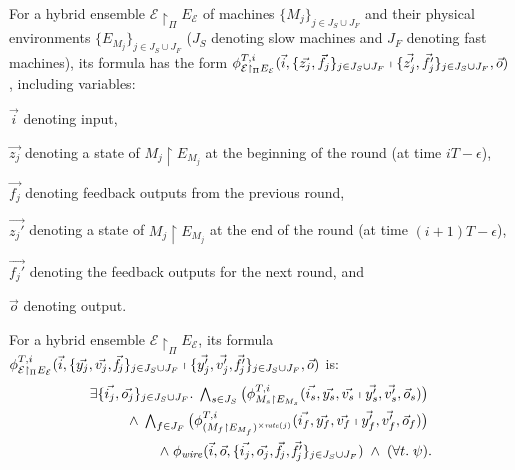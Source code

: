 For a hybrid ensemble $\mathcal{E} \restriction_{\Pi} E_\mathcal{E}$ 
of machines  $\{M_j\}_{j\in J_S\cup J_F}$ and their physical environments $\{E_{M_j}\}_{j\in J_S\cup J_F}$
($J_S$ denoting slow machines and $J_F$ denoting fast machines),
its formula has the form
$\phi_{\mathcal{E} \restriction_{\Pi} E_\mathcal{E}}^{T,i}(
	\vec{i}, \{\vec{z_j},\vec{f_j}\}_{j\in J_S\cup J_F}
	\shortmid 
	\{\vec{z'_j}, \vec{f_j'}\}_{j\in J_S\cup J_F}, \vec{o})$,
%
including variables:
\begin{inparaenum}[(i)]
	\item $\vec{i}$ denoting input, 
	\item $\vec{z_j}$ denoting a state of $M_j \restriction E_{M_j}$ at the beginning of the round 
		(at time $iT - \epsilon$),
	\item $\vec{f_j}$ denoting feedback outputs from the previous round,
	\item $\vec{z_j'}$ denoting a state of $M_j \restriction E_{M_j}$ at the end of the round 
		(at time $(i+1)T - \epsilon$), 
	\item $\vec{f_j'}$ denoting the feedback outputs for the next round,	and 
	\item $\vec{o}$ denoting output.
\end{inparaenum}


\begin{definition}
For a hybrid ensemble $\mathcal{E} \restriction_{\Pi} E_\mathcal{E}$, %
its formula
$\phi_{\mathcal{E} \restriction_{\Pi} E_\mathcal{E}}^{T,i}(
	\vec{i}, \{\vec{y_j}, \vec{v_j},\vec{\mathit{f}_j}\}_{j\in J_S\cup J_F}
	\shortmid 
	\{\vec{y'_j}, \vec{v'_j}, \vec{\mathit{f}_j'}\}_{j\in J_S\cup J_F}, \vec{o})$ is:
\begin{align*}
\exists \{\vec{i_j},\vec{o_j}\}_{j\in J_S\cup J_F}.\;
\textstyle\bigwedge_{s \in J_S}
\big(\phi_{M_s \restriction E_{M_s}}^{T,i}(\vec{i_s}, \vec{y_s}, \vec{v_s} \shortmid \vec{y'_s}, \vec{v'_s}, \vec{o}_s)\big)
\phantom{.}
\\
\wedge\;
\textstyle\bigwedge_{f \in J_F}
\big(\phi_{(M_f \restriction E_{M_f})^{\times\mathit{rate}(j)}}^{T,i}(\vec{i_f}, \vec{y_f}, \vec{v_f} \shortmid \vec{y'_f}, \vec{v'_f}, \vec{o}_f)\big)
\phantom{.}
\\
\wedge\;
\phi_\mathit{wire}(\vec{i},\vec{o},\{\vec{i_j},\vec{o_j},\vec{\mathit{f}_j},\vec{\mathit{f}_j'}\}_{j\in J_S\cup J_F})
\;\wedge\;
(\forall t.\; \psi).
\end{align*}
\end{definition}

